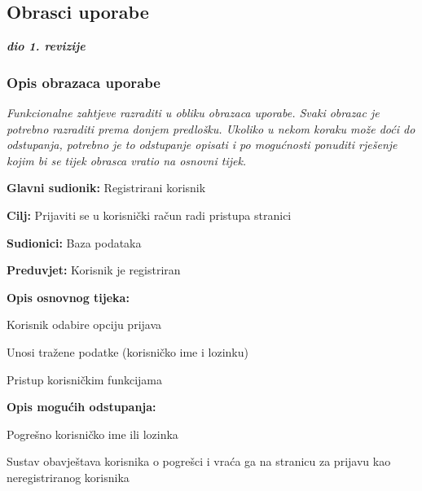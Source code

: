 			\eject 
			
			
				
			\subsection{Obrasci uporabe}
				
				\textbf{\textit{dio 1. revizije}}
				
				\subsubsection{Opis obrazaca uporabe}
					\textit{Funkcionalne zahtjeve razraditi u obliku obrazaca uporabe. Svaki obrazac je potrebno razraditi prema donjem predlošku. Ukoliko u nekom koraku može doći do odstupanja, potrebno je to odstupanje opisati i po mogućnosti ponuditi rješenje kojim bi se tijek obrasca vratio na osnovni tijek.}\\
					

					\noindent {}
					\begin{packed_item}
	
						\item \textbf{Glavni sudionik: }Registrirani korisnik
						\item  \textbf{Cilj:} Prijaviti se u korisnički račun radi pristupa stranici
						\item  \textbf{Sudionici:} Baza podataka
						\item  \textbf{Preduvjet:} Korisnik je registriran
						\item  \textbf{Opis osnovnog tijeka:}
						
						\item[] \begin{packed_enum}
	
							\item Korisnik odabire opciju prijava
							\item Unosi tražene podatke (korisničko ime i lozinku)
							\item Pristup korisničkim funkcijama
						\end{packed_enum}
						
						\item  \textbf{Opis mogućih odstupanja:}
						
						\item[] \begin{packed_item}
	
							\item[2.a] Pogrešno korisničko ime ili lozinka
							\item[] \begin{packed_enum}
								
								\item Sustav obavještava korisnika o pogrešci i vraća ga na stranicu za prijavu kao neregistriranog korisnika
							
							\end{packed_enum}
							
						\end{packed_item}
					\end{packed_item}
				
